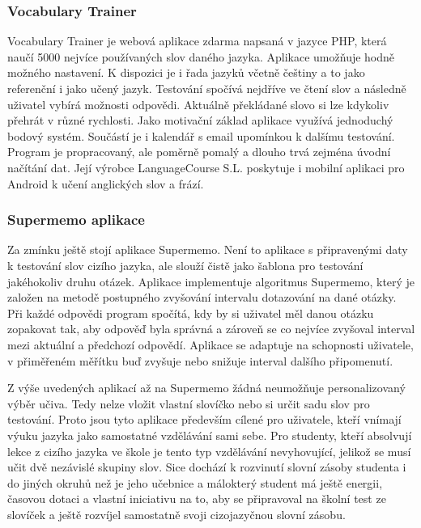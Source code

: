 \documentclass[a4paper,11pt,titlepage,fleqn]{article}
\begin{document}
        \subsubsection{Vocabulary Trainer}
            Vocabulary Trainer je webová aplikace zdarma napsaná v jazyce PHP, která naučí 5000 nejvíce používaných slov daného jazyka. Aplikace umožňuje hodně možného nastavení. K dispozici je i řada jazyků včetně češtiny a to jako referenční i jako učený jazyk. Testování spočívá nejdříve ve čtení slov a následně uživatel vybírá možnosti odpovědi. Aktuálně překládané slovo si lze kdykoliv přehrát v různé rychlosti. Jako motivační základ aplikace využívá jednoduchý bodový systém. Součástí je i kalendář s email upomínkou k dalšímu testování. Program je propracovaný, ale poměrně pomalý a dlouho trvá zejména úvodní načítání dat. Její výrobce LanguageCourse S.L. poskytuje i mobilní aplikaci pro Android k učení anglických slov a frází.

        \subsubsection{Supermemo aplikace}
            Za zmínku ještě stojí aplikace Supermemo. Není to aplikace s připravenými daty k testování slov cizího jazyka, ale slouží čistě jako šablona pro testování jakéhokoliv druhu otázek. Aplikace implementuje algoritmus Supermemo, který je založen na metodě postupného zvyšování intervalu dotazování na dané otázky. Při každé odpovědi program spočítá, kdy by si uživatel měl danou otázku zopakovat tak, aby odpověď byla správná a zároveň se co nejvíce zvyšoval interval mezi aktuální a předchozí odpovědí. Aplikace se adaptuje na schopnosti uživatele, v přiměřeném měřítku buď zvyšuje nebo snižuje interval dalšího připomenutí.



        Z výše uvedených aplikací až na Supermemo žádná neumožňuje personalizovaný výběr učiva. Tedy nelze vložit vlastní slovíčko nebo si určit sadu slov pro testování. Proto jsou tyto aplikace především cílené pro uživatele, kteří vnímají výuku jazyka jako samostatné vzdělávání sami sebe. Pro studenty, kteří absolvují lekce z cizího jazyka ve škole je tento typ vzdělávání nevyhovující, jelikož se musí učit dvě nezávislé skupiny slov. Sice dochází k rozvinutí slovní zásoby studenta i do jiných okruhů než je jeho učebnice a málokterý student má ještě energii, časovou dotaci a vlastní iniciativu na to, aby se připravoval na školní test ze slovíček a ještě rozvíjel samostatně svoji cizojazyčnou slovní zásobu.
\end{document}
